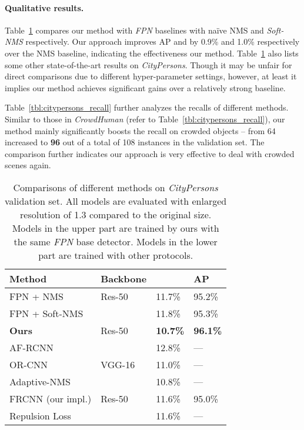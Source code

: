 \documentclass[10pt,twocolumn,letterpaper]{article}
\begin{document}
\paragraph{Qualitative results. }
Table~\ref{tbl:citypersons_eval} compares our method with \emph{FPN} baselines with na\"ive NMS and \emph{Soft-NMS} respectively. Our approach improves AP and  by 0.9\% and 1.0\% respectively over the NMS baseline, indicating the effectiveness our method. Table~\ref{tbl:citypersons_eval} also lists some other state-of-the-art results on \emph{CityPersons}. Though it may be unfair for direct comparisons due to different hyper-parameter settings, however, at least it implies our method achieves significant gains over a relatively strong baseline. 

Table~\ref{tbl:citypersons_recall} further analyzes the recalls of different methods. Similar to those in \emph{CrowdHuman} (refer to Table~\ref{tbl:citypersons_recall}), our method mainly significantly boosts the recall on crowded objects -- from 64 increased to \textbf{96} out of a total of 108 instances in the validation set. The comparison further indicates our approach is very effective to deal with crowded scenes again. 
 
\begin{table}[!htbp]
   \centering
   \begin{tabular}{p{35mm}|p{13mm}<{\centering}|p{10mm}<{\centering}p{8mm}<{\centering}}
\toprule
   Method & Backbone &  & AP \\
   \hline
   FPN + NMS & Res-50 & 11.7\% & 95.2\%  \\
   FPN + Soft-NMS \cite{softnms} &  & 11.8\% & 95.3\%  \\
   \hline
   \textbf{Ours}& Res-50 & \textbf{10.7\%} & \textbf{96.1\%}   \\
   \hline\hline
   AF-RCNN~\cite{zhang2017citypersons} &  & 12.8\% &---\\
   OR-CNN~\cite{zhang2018occlusion} & VGG-16 &11.0\% & ---\\
   Adaptive-NMS ~\cite{adaptiveNMS}  & &  10.8\% & ---  \\
   \hline
   FRCNN (our impl.) \cite{ren2015faster}  & Res-50 & 11.6\% & 95.0\% \\
   Repulsion Loss~\cite{repulseloss}&  & 11.6\% & --- \\
   \bottomrule
   \end{tabular}
   \caption{Comparisons of different methods on \emph{CityPersons} validation set. All models are evaluated with enlarged resolution of 1.3 compared to the original size. Models in the upper part are trained by ours with the same \emph{FPN} base detector. Models in the lower part are trained with other protocols. }
   \label{tbl:citypersons_eval}
\end{table}
\end{document}
